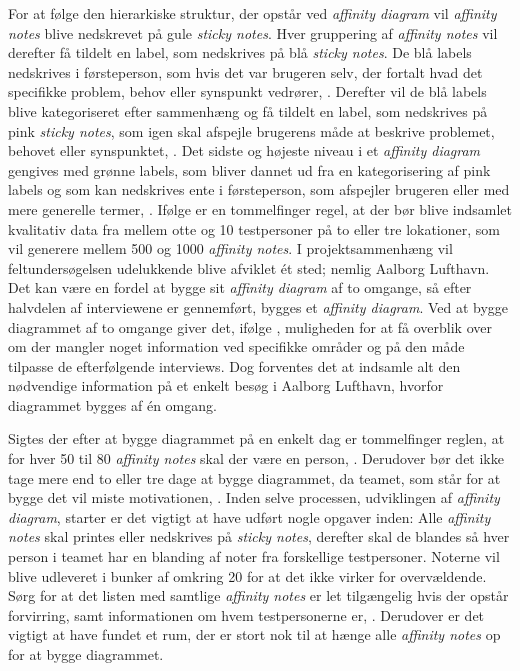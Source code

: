 For at følge den hierarkiske struktur, der opstår ved \textit{affinity diagram} vil \textit{affinity notes} blive nedskrevet på gule \textit{sticky notes}. Hver gruppering af \textit{affinity notes} vil derefter få tildelt en label, som nedskrives på blå \textit{sticky notes}. De blå labels nedskrives i førsteperson, som hvis det var brugeren selv, der fortalt hvad det specifikke problem, behov eller synspunkt vedrører, \parencite[s. 160]{Book:BuildingAnAffinity}. Derefter vil de blå labels blive kategoriseret efter sammenhæng og få tildelt en label, som nedskrives på pink \textit{sticky notes}, som igen skal afspejle brugerens måde at beskrive problemet, behovet eller synspunktet, \parencite[s. 160]{Book:BuildingAnAffinity}. Det sidste og højeste niveau i et \textit{affinity diagram} gengives med grønne labels, som bliver dannet ud fra en kategorisering af pink labels og som kan nedskrives ente i førsteperson, som afspejler brugeren eller med mere generelle termer, \parencite[s. 160]{Book:BuildingAnAffinity}. \blankline
%
Ifølge \textcite[s. 161]{Book:BuildingAnAffinity} er en tommelfinger regel, at der bør blive indsamlet kvalitativ data fra mellem otte og 10 testpersoner på to eller tre lokationer, som vil generere mellem 500 og 1000 \textit{affinity notes}. I projektsammenhæng vil feltundersøgelsen udelukkende blive afviklet ét sted; nemlig Aalborg Lufthavn. Det kan være en fordel at bygge sit \textit{affinity diagram} af to omgange, så efter halvdelen af interviewene er gennemført, bygges et \textit{affinity diagram}. Ved at bygge diagrammet af to omgange giver det, ifølge \textcite[s. 162]{Book:BuildingAnAffinity}, muligheden for at få overblik over om der mangler noget information ved specifikke områder og på den måde tilpasse de efterfølgende interviews. Dog forventes det at indsamle alt den nødvendige information på et enkelt besøg i Aalborg Lufthavn, hvorfor diagrammet bygges af én omgang. 

Sigtes der efter at bygge diagrammet på en enkelt dag er tommelfinger reglen, at for hver 50 til 80 \textit{affinity notes} skal der være en person, \parencite[s. 163]{Book:BuildingAnAffinity}. Derudover bør det ikke tage mere end to eller tre dage at bygge diagrammet, da teamet, som står for at bygge det vil miste motivationen, \parencite[s. 163]{Book:BuildingAnAffinity}.\blankline
%
Inden selve processen, udviklingen af \textit{affinity diagram}, starter er det vigtigt at have udført nogle opgaver inden: Alle \textit{affinity notes} skal printes eller nedskrives på \textit{sticky notes}, derefter skal de blandes så hver person i teamet har en blanding af noter fra forskellige testpersoner. Noterne vil blive udleveret i bunker af omkring 20 for at det ikke virker for overvældende. Sørg for at det listen med samtlige \textit{affinity notes} er let tilgængelig hvis der opstår forvirring, samt informationen om hvem testpersonerne er, \parencite[ss. 163-164]{Book:BuildingAnAffinity}. Derudover er det vigtigt at have fundet et rum, der er stort nok til at hænge alle \textit{affinity notes} op for at bygge diagrammet. 

